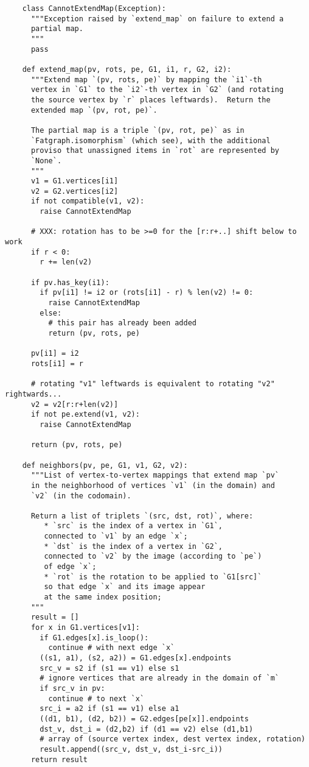 \begin{lstlisting}
    class CannotExtendMap(Exception):
      """Exception raised by `extend_map` on failure to extend a
      partial map.
      """
      pass

    def extend_map(pv, rots, pe, G1, i1, r, G2, i2):
      """Extend map `(pv, rots, pe)` by mapping the `i1`-th
      vertex in `G1` to the `i2`-th vertex in `G2` (and rotating
      the source vertex by `r` places leftwards).  Return the
      extended map `(pv, rot, pe)`.

      The partial map is a triple `(pv, rot, pe)` as in
      `Fatgraph.isomorphism` (which see), with the additional
      proviso that unassigned items in `rot` are represented by
      `None`.
      """
      v1 = G1.vertices[i1]
      v2 = G2.vertices[i2]
      if not compatible(v1, v2):
        raise CannotExtendMap

      # XXX: rotation has to be >=0 for the [r:r+..] shift below to work
      if r < 0:
        r += len(v2)

      if pv.has_key(i1):
        if pv[i1] != i2 or (rots[i1] - r) % len(v2) != 0:
          raise CannotExtendMap
        else:
          # this pair has already been added
          return (pv, rots, pe)

      pv[i1] = i2
      rots[i1] = r

      # rotating "v1" leftwards is equivalent to rotating "v2" rightwards...
      v2 = v2[r:r+len(v2)]
      if not pe.extend(v1, v2):
        raise CannotExtendMap

      return (pv, rots, pe)

    def neighbors(pv, pe, G1, v1, G2, v2):
      """List of vertex-to-vertex mappings that extend map `pv`
      in the neighborhood of vertices `v1` (in the domain) and
      `v2` (in the codomain).

      Return a list of triplets `(src, dst, rot)`, where:
         * `src` is the index of a vertex in `G1`,
         connected to `v1` by an edge `x`;
         * `dst` is the index of a vertex in `G2`,
         connected to `v2` by the image (according to `pe`)
         of edge `x`;
         * `rot` is the rotation to be applied to `G1[src]`
         so that edge `x` and its image appear
         at the same index position;
      """
      result = []
      for x in G1.vertices[v1]:
        if G1.edges[x].is_loop():
          continue # with next edge `x`
        ((s1, a1), (s2, a2)) = G1.edges[x].endpoints
        src_v = s2 if (s1 == v1) else s1
        # ignore vertices that are already in the domain of `m`
        if src_v in pv:
          continue # to next `x`
        src_i = a2 if (s1 == v1) else a1
        ((d1, b1), (d2, b2)) = G2.edges[pe[x]].endpoints
        dst_v, dst_i = (d2,b2) if (d1 == v2) else (d1,b1)
        # array of (source vertex index, dest vertex index, rotation)
        result.append((src_v, dst_v, dst_i-src_i))
      return result
      

\end{lstlisting}
